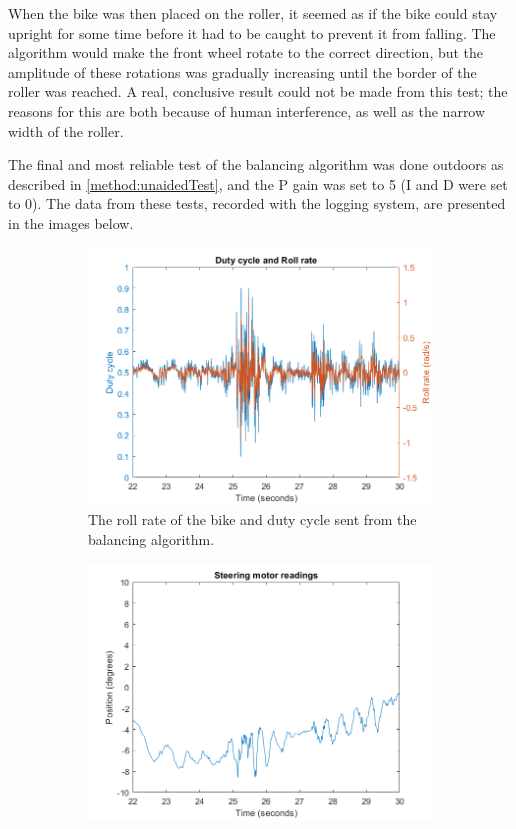 When the bike was then placed on the roller, it seemed as if the bike could stay upright for some time before it had to be caught to prevent it from falling. The algorithm would make the front wheel rotate to the correct direction, but the amplitude of these rotations was gradually increasing until the border of the roller was reached. A real, conclusive result could not be made from this test; the reasons for this are both because of human interference, as well as the narrow width of the roller.

The final and most reliable test of the balancing algorithm was done outdoors as described in \ref{method:unaidedTest}, and the P gain was set to 5 (I and D were set to 0). The data from these tests, recorded with the logging system, are presented in the images below.

\begin{figure}[H]
    \begin{subfigure}{.5\textwidth}
        \centering
        \includegraphics[width=\textwidth]{figure/dutyAndRoll.png}
        \caption{The roll rate of the bike and duty cycle sent from the balancing algorithm.}
        \label{fig:dutyAndRoll}
    \end{subfigure}
    \begin{subfigure}{.5\textwidth}
        \centering
        \includegraphics[width=\textwidth]{figure/motorPosition.png}

\end{subfigure}
\end{figure}
